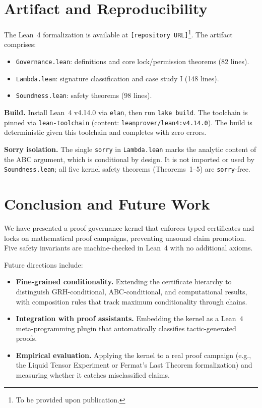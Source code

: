 \documentclass[runningheads]{llncs}
\begin{document}
\section{Artifact and Reproducibility}
\label{sec:artifact}

The Lean~4 formalization is available at
\texttt{[repository URL]}\footnote{To be provided upon publication.}.
The artifact comprises:

\begin{itemize}
\item \texttt{Governance.lean}: definitions and core lock/permission theorems
  (82 lines).
\item \texttt{Lambda.lean}: signature classification and case study I
  (148 lines).
\item \texttt{Soundness.lean}: safety theorems (98 lines).
\end{itemize}

\noindent
\textbf{Build.} Install Lean~4 v4.14.0 via \texttt{elan}, then run
\texttt{lake build}. The toolchain is pinned via
\texttt{lean-toolchain} (content: \texttt{leanprover/lean4:v4.14.0}).
The build is deterministic given this toolchain and completes with
zero errors.

\smallskip\noindent
\textbf{Sorry isolation.}
The single \texttt{sorry} in \texttt{Lambda.lean} marks the
analytic content of the ABC argument, which is conditional by
design. It is not imported or used by \texttt{Soundness.lean};
all five kernel safety theorems (Theorems~1--5) are
\texttt{sorry}-free.

\section{Conclusion and Future Work}
\label{sec:conclusion}

We have presented a proof governance kernel that enforces typed certificates
and locks on mathematical proof campaigns, preventing unsound claim promotion.
Five safety invariants are machine-checked in Lean~4 with no additional axioms.

Future directions include:
\begin{itemize}
\item \textbf{Fine-grained conditionality.} Extending the
  certificate hierarchy to distinguish GRH-conditional,
  ABC-conditional, and computational results, with composition
  rules that track maximum conditionality through chains.
\item \textbf{Integration with proof assistants.} Embedding the kernel as a
  Lean~4 meta-programming plugin that automatically classifies tactic-generated
  proofs.
\item \textbf{Empirical evaluation.} Applying the kernel to a real proof
  campaign (e.g., the Liquid Tensor Experiment or Fermat's Last Theorem
  formalization) and measuring whether it catches misclassified claims.
\end{itemize}
\end{document}
